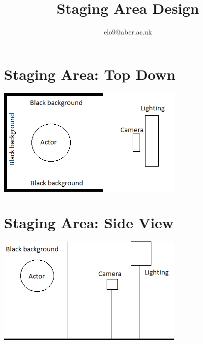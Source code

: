 \documentclass{article}
\title{Staging Area Design}
\author{elo9@aber.ac.uk}
\begin{document}
\maketitle
\tableofcontents

\newpage

\section{Staging Area: Top Down}
\includegraphics[width=\textwidth]{TopDown}
\section{Staging Area: Side View}
\includegraphics[width=\textwidth]{SideView}

\newpage
\end{document}
